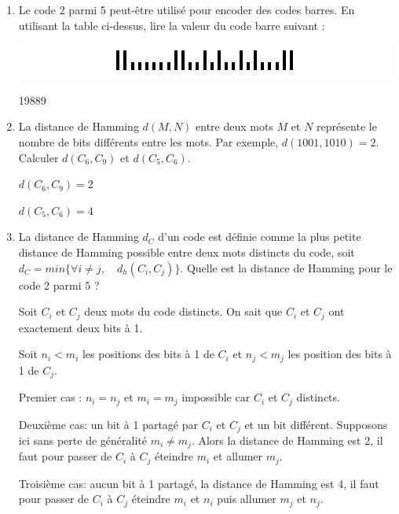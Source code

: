 \documentclass[a4paper,10pt]{exam}
\begin{document}
\begin{enumerate}

\item Le code 2 parmi 5 peut-être utilisé pour encoder des codes barres. En
  utilisant la table ci-dessus, lire la valeur du code barre suivant :
  \begin{center}
  \includegraphics{code-barre.png}
  \end{center}

  \begin{solution}
    19889
  \end{solution}

\item La distance de Hamming $d(M,N)$ entre deux mots $M$ et $N$ représente le
  nombre de bits différents entre les mots. Par exemple, $d(1001, 1010) = 2$.
  Calculer $d(C_6, C_9)$ et $d(C_5, C_6)$.
  \begin{solution}
    $d(C_6, C_9) = 2$

    $d(C_5, C_6) = 4$
  \end{solution}

\item La distance de Hamming $d_C$ d'un code est définie comme la plus petite
  distance de Hamming possible entre deux mots distincts du code, soit $d_C = min
  \{\forall i \neq j, \quad d_h(C_i,C_j) \}$. Quelle est la distance de Hamming
  pour le code 2 parmi 5 ?

  \begin{solution}
    Soit $C_i$ et $C_j$ deux mots du code distincts. On sait que $C_i$ et $C_j$
    ont exactement deux bits à 1.

    Soit $n_i < m_i$ les positions des bits à 1 de $C_i$ et $n_j < m_j$ les position
    des bits à 1 de $C_j$.

    Premier cas : $n_i = n_j$ et $m_i = m_j$ impossible car $C_i$ et $C_j$
    distincts.

    Deuxième cas: un bit à 1 partagé par $C_i$ et $C_j$ et un bit différent.
    Supposons ici sans perte de généralité $m_i \neq m_j$. Alors la distance de
    Hamming est 2, il faut pour passer de $C_i$ à $C_j$ éteindre $m_i$ et
    allumer $m_j$.

    Troisième cas: aucun bit à 1 partagé, la distance de Hamming est
    4, il faut pour passer de $C_i$ à $C_j$ éteindre $m_i$ et $n_i$ puis allumer
    $m_j$ et $n_j$.


\end{solution}
\end{enumerate}
\end{document}
